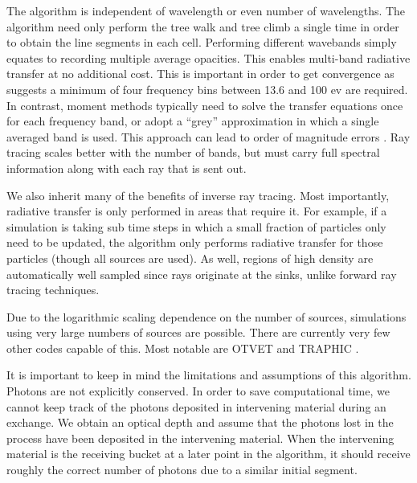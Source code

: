 The algorithm is independent of wavelength or even number of wavelengths. The algorithm need only perform the tree walk and tree climb a single time in order to obtain the line segments in each cell. Performing different wavebands simply equates to recording multiple average opacities. This enables multi-band radiative transfer at no additional cost. This is important in order to get convergence as \citet{mirochaEt12} suggests a minimum of four frequency bins between 13.6 and 100 ev are required. In contrast, moment methods typically need to solve the transfer equations once for each frequency band, or adopt a ``grey'' approximation in which a single averaged band is used. This approach can lead to order of magnitude errors \citep{altayTheuns13}. Ray tracing scales better with the number of bands, but must carry full spectral information along with each ray that is sent out.

We also inherit many of the benefits of inverse ray tracing. Most importantly, radiative transfer is only performed in areas that require it. For example, if a simulation is taking sub time steps in which a small fraction of particles only need to be updated, the algorithm only performs radiative transfer for those particles (though all sources are used). As well, regions of high density are automatically well sampled since rays originate at the sinks, unlike forward ray tracing techniques.


Due to the logarithmic scaling dependence on the number of sources, simulations using very large numbers of sources are possible. There are currently very few other codes capable of this. Most notable are OTVET \citep{petkovaSpringel09} and TRAPHIC \citep{pawlikSchaye08}.

It is important to keep in mind the limitations and assumptions of this algorithm. Photons are not explicitly conserved. In order to save computational time, we cannot keep track of the photons deposited in intervening material during an exchange. We obtain an optical depth and assume that the photons lost in the process have been deposited in the intervening material. When the intervening material is the receiving bucket at a later point in the algorithm, it should receive roughly the correct number of photons due to a similar initial segment.